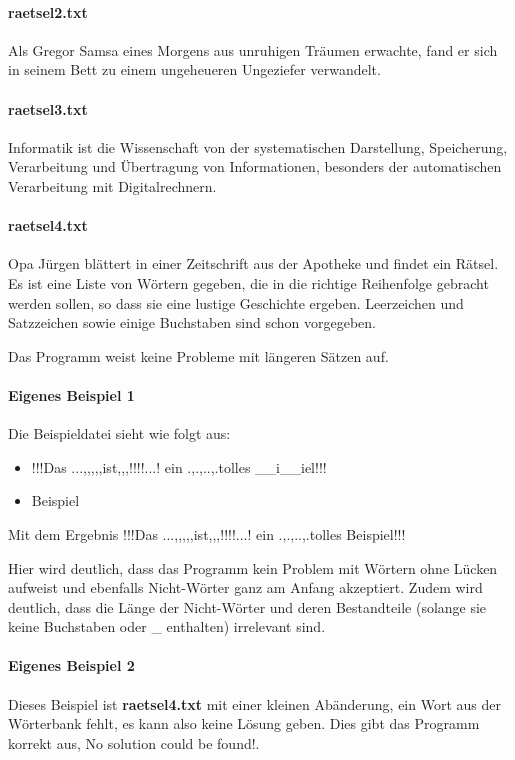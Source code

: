 \documentclass[a4paper,10pt,ngerman]{scrartcl}
\begin{document}
\paragraph{raetsel2.txt}
\glqq Als Gregor Samsa eines Morgens aus unruhigen Träumen erwachte, fand er sich in seinem Bett zu einem ungeheueren Ungeziefer verwandelt.\grqq{}

\paragraph{raetsel3.txt}
\glqq Informatik ist die Wissenschaft von der systematischen Darstellung, Speicherung, Verarbeitung und Übertragung von Informationen, besonders der automatischen Verarbeitung mit Digitalrechnern.\grqq{}

\paragraph{raetsel4.txt}
\glqq Opa Jürgen blättert in einer Zeitschrift aus der Apotheke und findet ein Rätsel. Es ist eine Liste von Wörtern gegeben, die in die richtige Reihenfolge gebracht werden sollen, so dass sie eine lustige Geschichte ergeben. Leerzeichen und Satzzeichen sowie einige Buchstaben sind schon vorgegeben.\grqq{}

Das Programm weist keine Probleme mit längeren Sätzen auf.

\paragraph{Eigenes Beispiel 1}
Die Beispieldatei sieht wie folgt aus:

\begin{itemize}
    \item[] !!!Das ...,,,,,ist,,,!!!!...! ein .,.,..,.tolles \_\_i\_\_iel!!!
    \item[] Beispiel
\end{itemize}

Mit dem Ergebnis \glqq !!!Das ...,,,,,ist,,,!!!!...! ein .,.,..,.tolles Beispiel!!!\grqq{}

Hier wird deutlich, dass das Programm kein Problem mit Wörtern ohne Lücken aufweist und ebenfalls Nicht-Wörter ganz am Anfang akzeptiert. Zudem wird deutlich, dass die Länge der Nicht-Wörter und deren Bestandteile (solange sie keine Buchstaben oder \glqq \_\grqq{} enthalten) irrelevant sind.

\paragraph{Eigenes Beispiel 2}
Dieses Beispiel ist \textbf{raetsel4.txt} mit einer kleinen Abänderung, ein Wort aus der Wörterbank fehlt, es kann also keine Lösung geben. Dies gibt das Programm korrekt aus, \glqq No solution could be found!\grqq{}.
\end{document}
